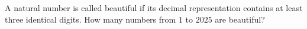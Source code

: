 A natural number is called beautiful if its decimal representation contains at least three identical digits. How many numbers from $1$ to $2025$ are beautiful?
